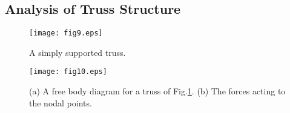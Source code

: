 \documentclass[10pt,a4j]{article}
\begin{document}
\subsection{Analysis of Truss Structure}
\begin{figure}[h]
	\begin{center}
	\texttt{[image: fig9.eps]} 
	\end{center}
	\caption{A simply supported truss.} 
	\label{fig:fig9}
\end{figure}
\begin{figure}[h]
	\begin{center}
	\texttt{[image: fig10.eps]} 
	\end{center}
	\caption{(a) A free body diagram for a truss of Fig.\ref{fig:fig9}. 
	(b) The forces acting to the nodal points.} 
	\label{fig:fig10}
\end{figure}
\end{document}
